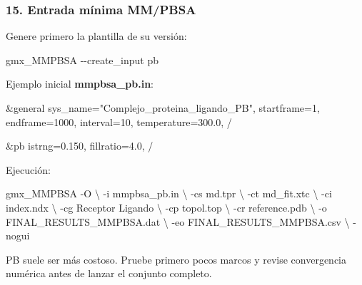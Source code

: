 \documentclass[
  spanish,
  11pt,
  a4paper]{article}
\newenvironment{Shaded}{\begin{snugshade}}{\end{snugshade}}
\newcommand{\AttributeTok}[1]{\textcolor[rgb]{0.13,0.29,0.53}{#1}}
\newcommand{\DataTypeTok}[1]{\textcolor[rgb]{0.13,0.29,0.53}{#1}}
\newcommand{\ExtensionTok}[1]{#1}
\newcommand{\NormalTok}[1]{#1}
\begin{document}
\subsubsection{15. Entrada mínima
MM/PBSA}\label{entrada-muxednima-mmpbsa}

Genere primero la plantilla de su versión:

\begin{Shaded}
\begin{Highlighting}[]
\ExtensionTok{gmx\_MMPBSA} \AttributeTok{{-}{-}create\_input}\NormalTok{ pb}
\end{Highlighting}
\end{Shaded}

Ejemplo inicial \textbf{mmpbsa\_pb.in}:

\begin{Shaded}
\begin{Highlighting}[]
\NormalTok{\&general}
\NormalTok{  sys\_name="Complejo\_proteina\_ligando\_PB",}
\NormalTok{  startframe=1,}
\NormalTok{  endframe=1000,}
\NormalTok{  interval=10,}
\NormalTok{  temperature=300.0,}
\NormalTok{/}

\NormalTok{\&pb}
\NormalTok{  istrng=0.150,}
\NormalTok{  fillratio=4.0,}
\NormalTok{/}
\end{Highlighting}
\end{Shaded}

Ejecución:

\begin{Shaded}
\begin{Highlighting}[]
\ExtensionTok{gmx\_MMPBSA} \AttributeTok{{-}O} \DataTypeTok{\textbackslash{}}
    \AttributeTok{{-}i}\NormalTok{ mmpbsa\_pb.in }\DataTypeTok{\textbackslash{}}
    \AttributeTok{{-}cs}\NormalTok{ md.tpr }\DataTypeTok{\textbackslash{}}
    \AttributeTok{{-}ct}\NormalTok{ md\_fit.xtc }\DataTypeTok{\textbackslash{}}
    \AttributeTok{{-}ci}\NormalTok{ index.ndx }\DataTypeTok{\textbackslash{}}
    \AttributeTok{{-}cg}\NormalTok{ Receptor Ligando }\DataTypeTok{\textbackslash{}}
    \AttributeTok{{-}cp}\NormalTok{ topol.top }\DataTypeTok{\textbackslash{}}
    \AttributeTok{{-}cr}\NormalTok{ reference.pdb }\DataTypeTok{\textbackslash{}}
    \AttributeTok{{-}o}\NormalTok{ FINAL\_RESULTS\_MMPBSA.dat }\DataTypeTok{\textbackslash{}}
    \AttributeTok{{-}eo}\NormalTok{ FINAL\_RESULTS\_MMPBSA.csv }\DataTypeTok{\textbackslash{}}
    \AttributeTok{{-}nogui}
\end{Highlighting}
\end{Shaded}

PB suele ser más costoso. Pruebe primero pocos marcos y revise
convergencia numérica antes de lanzar el conjunto completo.
\end{document}
